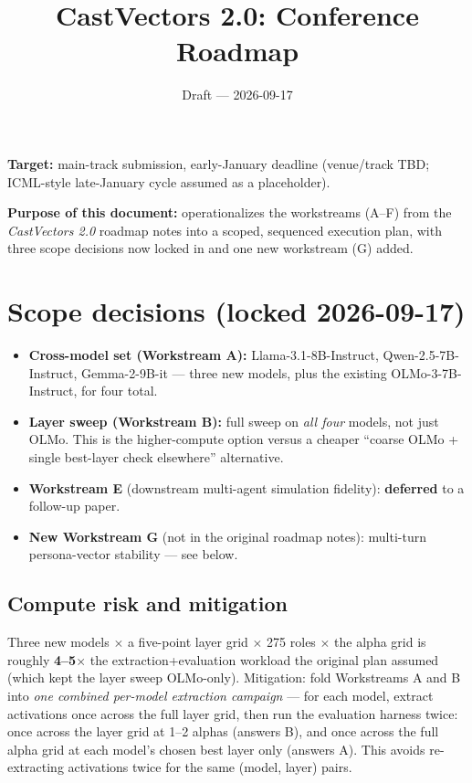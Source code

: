\documentclass[11pt]{article}
\title{\textbf{CastVectors 2.0: Conference Roadmap}}
\author{Draft --- 2026-09-17}
\date{}
\begin{document}
\maketitle
\vspace{-2em}

\noindent\textbf{Target:} main-track submission, early-January deadline (venue/track TBD;
ICML-style late-January cycle assumed as a placeholder).

\noindent\textbf{Purpose of this document:} operationalizes the workstreams (A--F) from the
\emph{CastVectors 2.0} roadmap notes into a scoped, sequenced execution plan, with three
scope decisions now locked in and one new workstream (G) added.

\section*{Scope decisions (locked 2026-09-17)}
\begin{itemize}
  \item \textbf{Cross-model set (Workstream A):} Llama-3.1-8B-Instruct, Qwen-2.5-7B-Instruct,
    Gemma-2-9B-it --- three new models, plus the existing OLMo-3-7B-Instruct, for four total.
  \item \textbf{Layer sweep (Workstream B):} full sweep on \emph{all four} models, not just
    OLMo. This is the higher-compute option versus a cheaper ``coarse OLMo + single
    best-layer check elsewhere'' alternative.
  \item \textbf{Workstream E} (downstream multi-agent simulation fidelity): \textbf{deferred}
    to a follow-up paper.
  \item \textbf{New Workstream G} (not in the original roadmap notes): multi-turn
    persona-vector stability --- see below.
\end{itemize}

\subsection*{Compute risk and mitigation}
Three new models $\times$ a five-point layer grid $\times$ 275 roles $\times$ the alpha
grid is roughly \textbf{4--5$\times$} the extraction+evaluation workload the original plan
assumed (which kept the layer sweep OLMo-only). Mitigation: fold Workstreams A and B into
\emph{one combined per-model extraction campaign} --- for each model, extract activations
once across the full layer grid, then run the evaluation harness twice: once across the
layer grid at 1--2 alphas (answers B), and once across the full alpha grid at each model's
chosen best layer only (answers A). This avoids re-extracting activations twice for the
same (model, layer) pairs.
\end{document}
